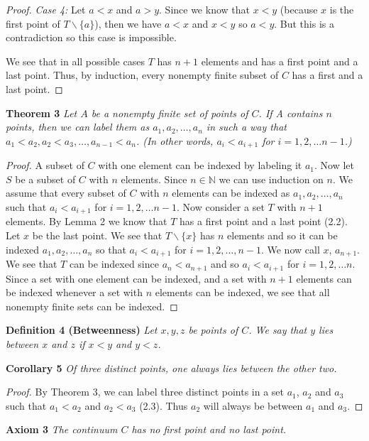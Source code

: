\documentclass{article}
\begin{document}
\begin{flushleft}
\begin{proof}
\textsl{Case 4:} Let $a<x$ and $a>y$. Since we know that $x<y$ (because $x$ is the first point of $T \backslash \{a\}$), then we have $a<x$ and $x<y$ so $a<y$. But this is a contradiction so this case is impossible.\newline

We see that in all possible cases $T$ has $n+1$ elements and has a first point and a last point. Thus, by induction, every nonempty finite subset of $C$ has a first and a last point.
\end{proof}

\textbf{Theorem 3}
\textsl{Let $A$ be a nonempty finite set of points of $C$. If A contains $n$ points, then we can label them as $a_1, a_2, \dots , a_n$ in such a way that $a_1 < a_2,  a_2 < a_3, \dots ,a_{n-1} < a_n$. (In other words, $a_i < a_{i+1}$ for $i = 1,2, \dots n - 1$.)}
\begin{proof}
A subset of $C$ with one element can be indexed by labeling it $a_1$. Now let $S$ be a subset of $C$ with $n$ elements. Since $n \in \mathbb{N}$ we can use induction on $n$. We assume that every subset of $C$ with $n$ elements can be indexed as $a_1,a_2, \dots ,a_n$ such that $a_i<a_{i+1}$ for $i=1,2,\dots n-1$. Now consider a set $T$ with $n+1$ elements. By Lemma 2 we know that $T$ has a first point and a last point (2.2). Let $x$ be the last point. We see that $T\backslash \{x\}$ has $n$ elements and so it can be indexed $a_1,a_2, \dots ,a_n$ so that $a_i<a_{i+1}$ for $i=1,2,\dots ,n-1$. We now call $x$, $a_{n+1}$. We see that $T$ can be indexed since $a_n<a_{n+1}$ and so $a_i<a_{i+1}$ for $i=1,2, \dots n$. Since a set with one element can be indexed, and a set with $n+1$ elements can be indexed whenever a set with $n$ elements can be indexed, we see that all nonempty finite sets can be indexed.
\end{proof}

\textbf{Definition 4 (Betweenness)}
\textsl{Let $x,y,z$ be points of $C$. We say that $y$ lies between $x$ and $z$ if $x<y$ and $y<z$.}\newline

\textbf{Corollary 5}
\textsl{Of three distinct points, one always lies between the other two.}
\begin{proof}
By Theorem 3, we can label three distinct points in a set $a_1$, $a_2$ and $a_3$ such that $a_1 < a_2$ and $a_2 < a_3$ (2.3). Thus $a_2$ will always be between $a_1$ and $a_3$.
\end{proof}

\textbf{Axiom 3}
\textsl{The continuum $C$ has no first point and no last point.}\newline


\end{flushleft}
\end{document}
